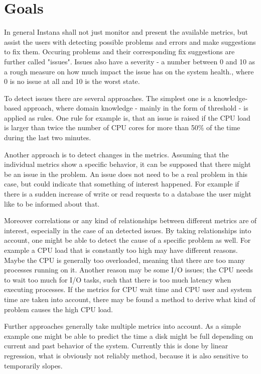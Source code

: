 \documentclass[]{article}
\begin{document}
\section{Goals}
In general Instana shall not just monitor and present the available metrics, but assist the users with detecting possible problems and errors and make suggestions to fix them.
Occuring problems and their corresponding fix suggestions are further called "issues".
Issues also have a severity - a number between 0 and 10 as a rough measure on how much impact the issue has on the system health., where 0 is no issue at all and 10 is the worst state.

To detect issues there are several approaches.
The simplest one is a knowledge-based approach, where domain knowledge - mainly in the form of threshold - is applied as rules.
One rule for example is, that an issue is raised if the CPU load is larger than twice the number of CPU cores for more than 50\% of the time during the last two minutes.

Another approach is to detect changes in the metrics.
Assuming that the individual metrics show a specific behavior, it can be supposed that there might be an issue in the problem.
An issue does not need to be a real problem in this case, but could indicate that something of interest happened.
For example if there is a sudden increase of write or read requests to a database the user might like to be informed about that.

Moreover correlations or any kind of relationships between different metrics are of interest, especially in the case of an detected issues.
By taking relationships into account, one might be able to detect the cause of a specific problem as well.
For example a CPU load that is constantly too high may have different reasons.
Maybe the CPU is generally too overloaded, meaning that there are too many processes running on it.
Another reason may be some I/O issues; the CPU needs to wait too much for I/O tasks, such that there is too much latency when executing processes.
If the  metrics for CPU wait time and CPU user and system time are taken into account, there may be found a method to derive what kind of problem causes the high CPU load.

Further approaches generally take multiple metrics into account.
As a simple example one might be able to predict the time a disk might be full depending on current and past behavior of the system. 
Currently this is done by linear regression, what is obviously not reliably method, because it is also sensitive to temporarily slopes.
\end{document}

